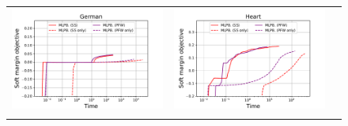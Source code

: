 \begin{figure}[p]
\begin{tabular}{ccc}
\begin{minipage}[t]{0.31\hsize}
            \includegraphics[keepaspectratio, scale=0.30]
            {figure/compare_fw_german.pdf}
        \end{minipage}
        &
        \begin{minipage}[t]{0.31\hsize}
            \centering
            \includegraphics[keepaspectratio, scale=0.30]
            {figure/compare_fw_heart.pdf}
        \end{minipage}
        \\
        \begin{minipage}[t]{0.31\hsize}
            \centering
            \includegraphics[keepaspectratio, scale=0.30]

\end{minipage}
\end{tabular}
\end{figure}
